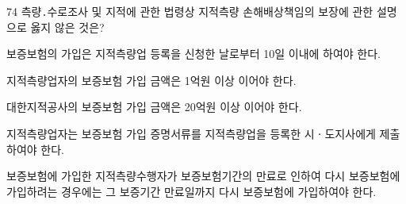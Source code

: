 \begin{question}{74}
측량․수로조사 및 지적에 관한 법령상 지적측량 손해배상책임의 보장에 관한 설명으로 옳지 않은 것은?
\begin{choices}
  \item 보증보험의 가입은 지적측량업 등록을 신청한 날로부터 10일 이내에 하여야 한다.
  \item 지적측량업자의 보증보험 가입 금액은 1억원 이상 이어야 한다.
  \item 대한지적공사의 보증보험 가입 금액은 20억원 이상 이어야 한다.
  \item 지적측량업자는 보증보험 가입 증명서류를 지적측량업을 등록한 시ㆍ도지사에게 제출하여야 한다.
  \item 보증보험에 가입한 지적측량수행자가 보증보험기간의 만료로 인하여 다시 보증보험에 가입하려는 경우에는 그 보증기간 만료일까지 다시 보증보험에 가입하여야 한다.
\end{choices}
\end{question}
